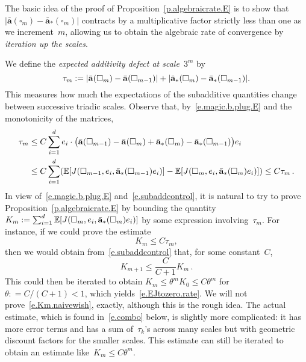 \documentclass[11pt,twoside]{article} %
\let\oldsquare\square %
\renewcommand{\square}{\oldsquare}
\numberwithin{equation}{section}
\theoremstyle{definition}
\let\originalleft\left
\let\originalright\right
\renewcommand{\left}{\mathopen{}\mathclose\bgroup\originalleft}
\renewcommand{\right}{\aftergroup\egroup\originalright}
\renewcommand{\a}{\mathbf{a}}
\newcommand{\ahom}{\bar{\a}}
\newcommand{\cu}{\square}
\newcommand{\E}{\mathbb{E}}
\begin{document}
The basic idea of the proof of Proposition~\ref{p.algebraicrate.E} is to show that~$| \ahom(\cu_m) - \ahom_*(\cu_m)|$ contracts by a multiplicative factor strictly less than one as we increment~$m$, 
allowing us to obtain the algebraic rate of convergence by \emph{iteration up the scales}.

\smallskip

We define the \emph{expected additivity defect at scale~$3^m$} by
\begin{equation}
\label{e.taun}
\tau_m := \left|\ahom (\cu_{m}) - \ahom(\cu_{m-1} )\right| + \left|  \ahom_*(\cu_{m}) - \ahom_*(\cu_{m-1} )\right|.
\end{equation}
This measures how much the expectations of the subadditive quantities change between successive triadic scales. 
Observe that, by~\eqref{e.magic.b.plug.E} and the monotonicity of the matrices,
\begin{align}
\label{e.subaddcontrol}
\tau_m
& 
\leq 
C \sum_{i=1}^d  e_i \cdot  
\bigl(\ahom(\cu_{m-1}) - \ahom(\cu_{m}) + \ahom_*(\cu_{m}) - \ahom_*(\cu_{m-1})   \bigr)  e_i
\notag \\ & 
\leq
C \sum_{i=1}^d \left( \E \left[ J(\cu_{m-1},e_i,\ahom_*(\cu_{m-1}) e_i)\right] - \E \left[ J(\cu_{m},e_i,\ahom_*(\cu_{m}) e_i)\right] \right)
\leq
C \tau_m
\,.
\end{align}
In view of~\eqref{e.magic.b.plug.E} and~\eqref{e.subaddcontrol}, it is natural to try to prove Proposition~\ref{p.algebraicrate.E} by bounding the quantity~$K_m:= \sum_{i=1}^d \E \left[ J(\cu_{m},e_i,\ahom_*(\cu_m) e_i)\right]$ by some expression involving~$\tau_m$. For instance, if we could prove the estimate 
\begin{equation}
\label{e.Km.naivewish}
K_m \leq C\tau_m, 
\end{equation}
then we would obtain from~\eqref{e.subaddcontrol} that, for some constant~$C$,
\begin{equation*}
K_{m+1} \leq \frac{C}{C+1} K_m
\,.
\end{equation*}
This could then be iterated to obtain 
$K_m \leq \theta^m K_0 \leq C\theta^m$ for~$\theta : = C/(C+1)<1$, which yields~\eqref{e.EJtozero.rate}. We will not prove~\eqref{e.Km.naivewish}, exactly, although this is the rough idea. The actual estimate, which is found in~\eqref{e.combo} below, is slightly more complicated: it has more error terms and has a sum of~$\tau_k$'s across many scales but with geometric discount factors for the smaller scales. 
This estimate can still be iterated to obtain an estimate like~$K_m \leq C \theta^m$. 
\end{document}
